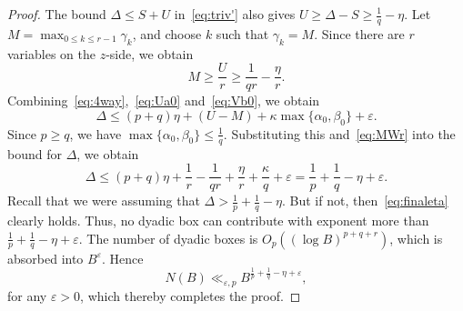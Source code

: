 \documentclass[10pt,a4paper]{amsart}
\renewcommand{\ge}{\geqslant}
\renewcommand{\le}{\leqslant}
\newcommand\ve{\varepsilon}
\begin{document}
\begin{proof}
The bound $\Delta\le S+U$ 
in~\eqref{eq:triv'}
also gives
$
U\ge \Delta-S\ge \frac1q-\eta.
$
Let
$M=\max_{0\le k\le r-1}\gamma_k$,
and choose $k$ such that $\gamma_k=M$. Since there are $r$ variables on the $z$-side, we obtain
\begin{equation}\label{eq:MWr}
 M\ge \frac Ur\ge \frac1{qr}-\frac{\eta}{r}.
\end{equation}
Combining~\eqref{eq:4way},~\eqref{eq:Ua0} and~\eqref{eq:Vb0}, we obtain
\[
\Delta
\le
(p+q)\eta+(U-M)
+\kappa\max\{\alpha_0,\beta_0\}+\ve.
\]
Since $p\ge q$, we have 
$
\max\{\alpha_0,\beta_0\}
\le
\frac 1q.
$
Substituting this and~\eqref{eq:MWr} into the bound for $\Delta$, we obtain
\begin{equation}\label{eq:finaleta}
\Delta
\le
(p+q)\eta+
\frac1r-\frac1{qr}+\frac{\eta}{r}+\frac{\kappa}{q}+\ve=
\frac 1p+\frac 1q-\eta+\ve.
\end{equation}
Recall that we were assuming that $\Delta> \frac 1p+\frac 1q-\eta $. But if not, then~\eqref{eq:finaleta} clearly holds.
Thus, no dyadic box can contribute with exponent more than $\frac1p+\frac1q-\eta+\ve$.
The number of dyadic boxes is $O_{p}((\log B)^{p+q+r})$, which is
absorbed into $B^\varepsilon$. Hence
\[
N(B)\ll_{\varepsilon,p}B^{\frac 1p+\frac 1q-\eta+\varepsilon},
\]
for any $\ve>0$, which thereby completes the proof. 
\end{proof}
\end{document}
